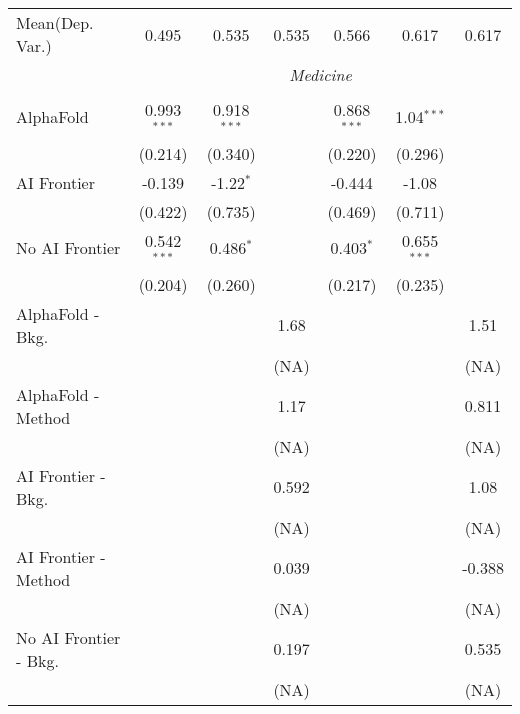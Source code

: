 \begin{tabular}{lcccccc}
Mean(Dep. Var.) & 0.495 & 0.535 & 0.535 & 0.566 & 0.617 & 0.617 \\
 & \multicolumn{6}{c}{\textit{Medicine}} \\ \\
   AlphaFold               & 0.993$^{***}$ & 0.918$^{***}$ &       & 0.868$^{***}$ & 1.04$^{***}$  &   \\   
                           & (0.214)       & (0.340)       &       & (0.220)       & (0.296)       &   \\   
   AI Frontier             & -0.139        & -1.22$^{*}$   &       & -0.444        & -1.08         &   \\   
                           & (0.422)       & (0.735)       &       & (0.469)       & (0.711)       &   \\   
   No AI Frontier          & 0.542$^{***}$ & 0.486$^{*}$   &       & 0.403$^{*}$   & 0.655$^{***}$ &   \\   
                           & (0.204)       & (0.260)       &       & (0.217)       & (0.235)       &   \\   
   AlphaFold - Bkg.        &               &               & 1.68  &               &               & 1.51\\   
                           &               &               & (NA)  &               &               & (NA)\\   
   AlphaFold - Method      &               &               & 1.17  &               &               & 0.811\\   
                           &               &               & (NA)  &               &               & (NA)\\   
   AI Frontier - Bkg.      &               &               & 0.592 &               &               & 1.08\\   
                           &               &               & (NA)  &               &               & (NA)\\   
   AI Frontier - Method    &               &               & 0.039 &               &               & -0.388\\   
                           &               &               & (NA)  &               &               & (NA)\\   
   No AI Frontier - Bkg.   &               &               & 0.197 &               &               & 0.535\\   
                           &               &               & (NA)  &               &               & (NA)\\   

\end{tabular}
